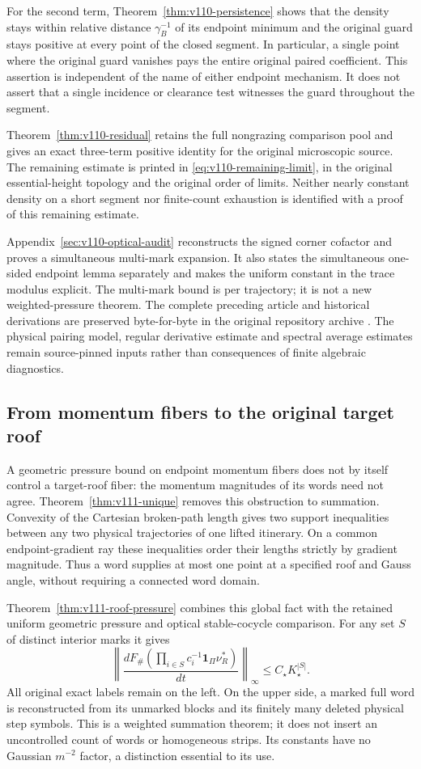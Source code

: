 \documentclass[11pt,reqno]{amsart}
\numberwithin{equation}{section}
\theoremstyle{definition}\newtheorem{definition}[theorem]{Definition}
\theoremstyle{remark}\newtheorem{remark}[theorem]{Remark}
\newcommand{\one}{\mathbf1}\newcommand{\dd}{\,\mathrm d}
\begin{document}
For the second term, Theorem~\ref{thm:v110-persistence} shows that the
density stays within relative distance $\gamma_B^{-1}$ of its
endpoint minimum and the original guard stays positive at every
point of the closed segment. In particular, a single point where
the original guard vanishes pays the entire original paired
coefficient. This assertion is independent of the name of either
endpoint mechanism. It does not assert that a single incidence or
clearance test witnesses the guard throughout the segment.

Theorem~\ref{thm:v110-residual} retains the full nongrazing comparison
pool and gives an exact three-term positive identity for the
original microscopic source. The remaining estimate is printed in
\eqref{eq:v110-remaining-limit}, in the original essential-height
topology and the original order of limits. Neither nearly constant
density on a short segment nor finite-count exhaustion is identified
with a proof of this remaining estimate.

Appendix~\ref{sec:v110-optical-audit} reconstructs the signed corner
cofactor and proves a simultaneous multi-mark expansion. It also
states the simultaneous one-sided endpoint lemma separately and
makes the uniform constant in the trace modulus explicit. The
multi-mark bound is per trajectory; it is not a new weighted-pressure
theorem. The complete preceding article and historical derivations
are preserved byte-for-byte in the original repository archive \cite{Q110}.
The physical pairing model, regular derivative estimate and spectral
average estimates remain source-pinned inputs rather than consequences
of finite algebraic diagnostics.

\subsection*{From momentum fibers to the original target roof}
A geometric pressure bound on endpoint momentum fibers does not by
itself control a target-roof fiber: the momentum magnitudes of its
words need not agree. Theorem~\ref{thm:v111-unique} removes this
obstruction to summation. Convexity of the Cartesian broken-path
length gives two support inequalities between any two physical
trajectories of one lifted itinerary. On a common endpoint-gradient
ray these inequalities order their lengths strictly by gradient
magnitude. Thus a word supplies at most one point at a specified
roof and Gauss angle, without requiring a connected word domain.

Theorem~\ref{thm:v111-roof-pressure} combines this global fact with
the retained uniform geometric pressure and optical stable-cocycle
comparison. For any set $S$ of distinct interior marks it gives
\[
 \left\|\frac{dF_\#(\prod_{i\in S}c_i^{-1}\one_\Pi\nu_R^*)}{dt}
             \right\|_\infty\le C_\star K_\star^{|S|}.
\]
All original exact labels remain on the left. On the upper side,
a marked full word is reconstructed from its unmarked blocks and
its finitely many deleted physical step symbols. This is a weighted
summation theorem; it does not insert an uncontrolled count of words
or homogeneous strips. Its constants have no Gaussian $m^{-2}$
factor, a distinction essential to its use.
\end{document}

